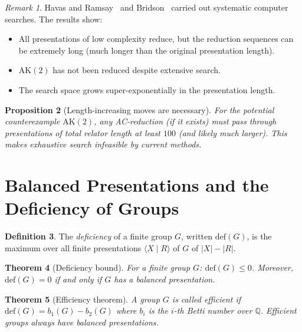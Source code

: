 \documentclass[12pt,a4paper]{amsart}
\newtheorem{theorem}{Theorem}[section]
\newtheorem{proposition}[theorem]{Proposition}
\theoremstyle{definition}
\newtheorem{definition}[theorem]{Definition}
\theoremstyle{remark}
\newtheorem{remark}[theorem]{Remark}
\begin{document}
\begin{remark}
Havas and Ramsay~\cite{HR03} and Bridson~\cite{Bridson15} carried out systematic
computer searches. The results show:
\begin{itemize}
  \item All presentations of low complexity reduce, but the reduction sequences
        can be extremely long (much longer than the original presentation length).
  \item $\mathrm{AK}(2)$ has not been reduced despite extensive search.
  \item The search space grows super-exponentially in the presentation length.
\end{itemize}
\end{remark}

\begin{proposition}[Length-increasing moves are necessary]
For the potential counterexample $\mathrm{AK}(2)$, any AC-reduction (if it
exists) must pass through presentations of total relator length at least $100$
(and likely much larger). This makes exhaustive search infeasible by current methods.
\end{proposition}

\section{Balanced Presentations and the Deficiency of Groups}

\begin{definition}
The \emph{deficiency} of a finite group $G$, written $\mathrm{def}(G)$, is the
maximum over all finite presentations $\langle X \mid R \rangle$ of $G$ of
$|X| - |R|$.
\end{definition}

\begin{theorem}[Deficiency bound]\label{thm:defbound}
For a finite group $G$: $\mathrm{def}(G) \leq 0$.
Moreover, $\mathrm{def}(G) = 0$ if and only if $G$ has a balanced presentation.
\end{theorem}

\begin{theorem}[Efficiency theorem]\label{thm:efficiency}
A group $G$ is called \emph{efficient} if $\mathrm{def}(G) = b_1(G) - b_2(G)$
where $b_i$ is the $i$-th Betti number over $\mathbb{Q}$. Efficient groups always
have balanced presentations.
\end{theorem}
\end{document}
